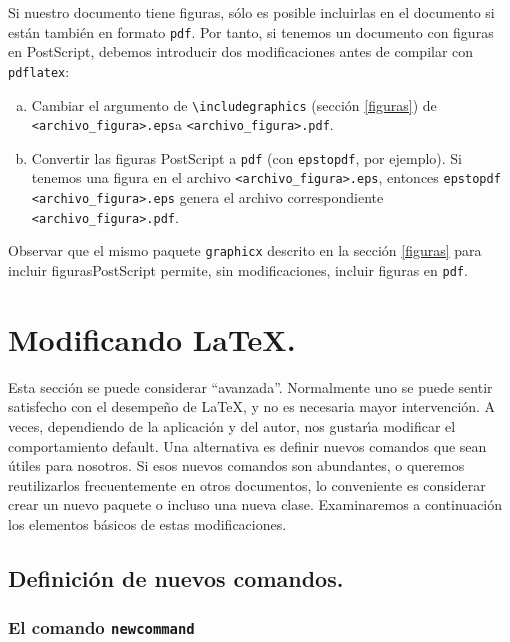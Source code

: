 {Si nuestro documento tiene figuras, s\'olo es posible incluirlas en el
documento si est\'an tambi\'en en formato \verb+pdf+. Por tanto, si
tenemos un documento con figuras en PostScript, debemos introducir dos
modificaciones antes de compilar con \verb+pdflatex+:

\begin{enumerate}[a)]
\item Cambiar el argumento de \verb+\includegraphics+ (secci\'on
  \ref{figuras}) de \verb+<archivo_figura>.eps+\linebreak a
  \verb+<archivo_figura>.pdf+.
\item Convertir las figuras PostScript a \verb+pdf+ (con
  \verb+epstopdf+, por ejemplo). Si tenemos una figura en el archivo
  \verb+<archivo_figura>.eps+, entonces 
\verb+epstopdf <archivo_figura>.eps+ genera el archivo correspondiente
\verb+<archivo_figura>.pdf+.
\end{enumerate}

Observar que el mismo paquete \verb+graphicx+ descrito en la secci\'on
\ref{figuras} para incluir figuras\linebreak \mbox{PostScript} permite, sin
modificaciones, incluir figuras en \verb+pdf+.

\section{Modificando  \LaTeX.}

Esta secci\'on se puede considerar ``avanzada''. Normalmente uno se
puede sentir satisfecho con el desempe\~no de \LaTeX, y no es
necesaria mayor intervenci\'on. A veces, dependiendo de la
aplicaci\'on y del autor, nos gustar\'{\i}a modificar el
comportamiento default. Una alternativa es definir nuevos comandos que
sean \'utiles para nosotros. Si esos nuevos comandos son abundantes, o
queremos reutilizarlos frecuentemente en otros documentos, lo
conveniente es considerar crear un nuevo paquete o incluso una nueva
clase. Examinaremos a continuaci\'on los elementos b\'asicos de estas
modificaciones. 

\subsection{Definici\'on de nuevos comandos.}

\subsubsection{El comando {\tt \bslash newcommand}}

}
